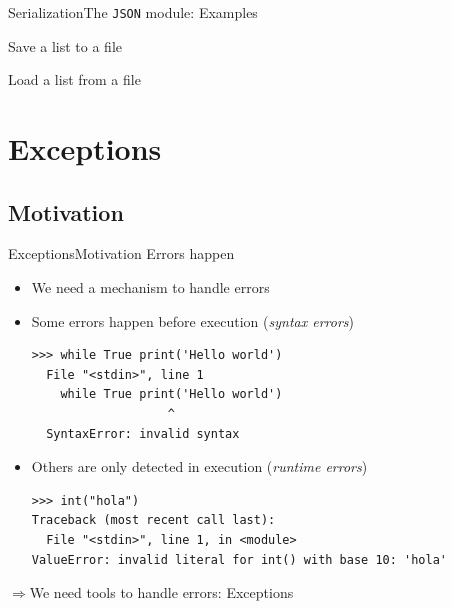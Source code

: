 \documentclass[10pt,compress]{beamer} %
\begin{document}
\begin{frame}[fragile]{Serialization}{The \texttt{JSON} module: Examples}
	\begin{exampleblock}{Save a list to a file}
	\vspace{-0.2cm}
	
	\vspace{-0.2cm}
	\end{exampleblock}

	\begin{exampleblock}{Load a list from a file}
	\vspace{-0.2cm}
	
	\vspace{-0.2cm}
	\end{exampleblock}
\end{frame}

\section{Exceptions}
\subsection{Motivation}

\begin{frame}[fragile]{Exceptions}{Motivation}
	Errors happen
	\begin{itemize}
		\item We need a mechanism to handle errors
	    \item Some errors happen before execution (\textit{syntax errors})

\begin{verbatim}
>>> while True print('Hello world')
  File "<stdin>", line 1
    while True print('Hello world')
                   ^
  SyntaxError: invalid syntax
\end{verbatim}

		\item Others are only detected in execution (\textit{runtime errors})

\begin{verbatim}
>>> int("hola")
Traceback (most recent call last):
  File "<stdin>", line 1, in <module>
ValueError: invalid literal for int() with base 10: 'hola'
\end{verbatim}

    \end{itemize}
    $\Rightarrow$We need tools to handle errors: \alert{Exceptions}
\end{frame}
\end{document}
